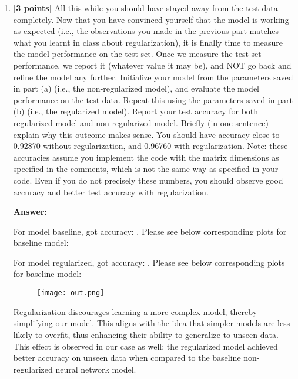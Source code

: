 \documentclass{article}
\begin{document}
\begin{enumerate}[label=(\alph*)]
 
\item \textbf{[3 points]} All this while you should have stayed away from the test data completely. Now that you have convinced yourself that the model is working as expected (i.e., the observations you made in the previous part matches what you learnt in class about regularization), it is finally time to measure the model performance on the test set. Once we measure the test set performance, we report it (whatever value it may be), and NOT go back and refine the model any further.
Initialize your model from the parameters saved in part (a) (i.e., the non-regularized model), and evaluate the model performance on the test data. Repeat this using the parameters saved in part (b) (i.e., the regularized model).
Report your test accuracy for both regularized model and non-regularized model. Briefly (in one sentence) explain why this outcome makes sense. You should have accuracy close to 0.92870 without regularization, and 0.96760 with regularization. Note: these accuracies assume you implement the code with the matrix dimensions as specified in the comments, which is not the same way as specified in your code. Even if you do not precisely these numbers, you should observe good accuracy and better test accuracy with regularization.

\textbf{Answer:}

For model baseline, got accuracy: . Please see below corresponding plots for baseline model:


For model regularized, got accuracy: . Please see below corresponding plots for baseline model:

\begin{figure}[H]
    \centering
    \texttt{[image: out.png]}
    \label{fig:out}
\end{figure}

Regularization discourages learning a more complex model, thereby simplifying our model. This aligns with the idea that simpler models are less likely to overfit, thus enhancing their ability to generalize to unseen data. This effect is observed in our case as well; the regularized model achieved better accuracy on unseen data when compared to the baseline non-regularized neural network model.




\end{enumerate}
\end{document}

